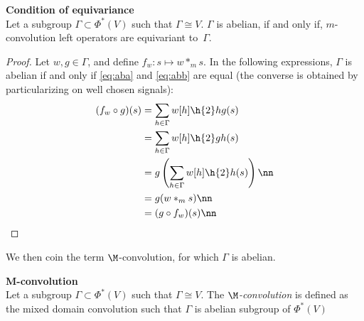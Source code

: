 \begin{proposition}\textbf{Condition of equivariance}\\
Let a subgroup $\Gamma \subset \Phi^*(V)$ such that $\Gamma \cong V$. $\Gamma$ is abelian, if and only if, $m$-convolution left operators are equivariant to~$\Gamma$.
\end{proposition}
\begin{proof}
Let $w, g \in \Gamma$, and define $f_w: s \mapsto w \ast_m s$. In the following expressions, $\Gamma$ is abelian if and only if \eqref{eq:aba} and \eqref{eq:abb} are equal (the converse is obtained by particularizing on well chosen signals):
\begin{align}
(f_w \circ g) (s) & = \displaystyle \sum_{h \in \Gamma} w[h] \h{2} hg(s) \label{eq:aba}\\
 & = \displaystyle \sum_{h \in \Gamma} w[h] \h{2} gh(s) \label{eq:abb}\\
 & = \displaystyle g\left(\sum_{h \in \Gamma} w[h] \h{2} h(s)\right) \nn\\
 & = g(w \ast_m s ) \nn\\
 & = (g \circ f_w) (s) \nn
\end{align}
\end{proof}

We then coin the term $\M$-convolution, for which $\Gamma$ is abelian.

\begin{definition}\textbf{M-convolution}\\
Let a subgroup $\Gamma \subset \Phi^*(V)$ such that $\Gamma \cong V$. The \emph{$\M$-convolution} is defined as the mixed domain convolution such that $\Gamma$ is abelian subgroup of $\Phi^*(V)$
\end{definition}






